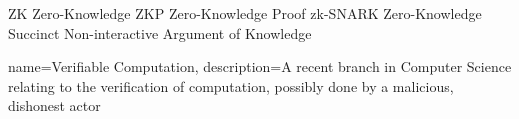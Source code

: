               {ZK}             {Zero-Knowledge}
             {ZKP}            {Zero-Knowledge Proof}
         {zk-SNARK}       {Zero-Knowledge Succinct Non-interactive Argument of Knowledge}


{
  name=Verifiable Computation,
  description={A recent branch in Computer Science relating to the verification of computation, possibly done by a malicious, dishonest actor}
}


